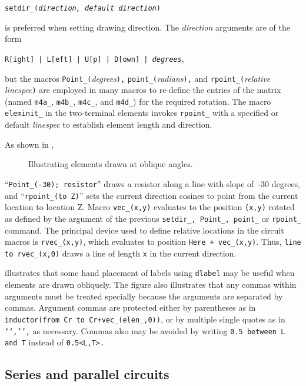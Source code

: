 {\tt setdir\_({\sl direction, default direction})}

\noindent
is preferred when setting drawing direction.  The {\sl direction} arguments
are of the form

{\tt R[ight] | L[eft] | U[p] | D[own] | {\sl degrees}},

\noindent
but the macros
{\tt Point\_(}{\sl degrees}{\tt ),}
{\tt point\_(}{\sl radians}{\tt ),}
and {\tt rpoint\_(}{\sl relative linespec}{\tt )} are employed in many macros
to re-define the entries
of the matrix
(named {\tt m4a\_}, {\tt m4b\_}, {\tt m4c\_}, and {\tt m4d\_})
for the required rotation.
The macro {\tt eleminit\_} in the two-terminal elements invokes
{\tt rpoint\_} with a specified or default {\sl linespec}
to establish element length and direction.

As shown in ,
\begin{figure}[ht]
\vspace{-\baselineskip}
   \parbox{4.5in}{\small }%
   \hfill\raise-0.7in\llap{\hbox{ }}%
   \vspace{-\baselineskip}
   \caption{Illustrating elements drawn at oblique angles.}
   \label{Oblique}
   \end{figure}
``{\tt Point\_(-30); resistor}'' draws a resistor
along a line with slope of~-30 degrees, and ``{\tt rpoint\_(to Z)}'' sets
the current direction cosines to point from the current location to location Z.
Macro {\tt vec\_(x,y)}
evaluates to the position {\tt (x,y)} rotated as defined by the
argument of the previous
{\tt setdir\_, Point\_, point\_} or {\tt rpoint\_} command.
The principal device used to define relative locations in the circuit macros
is {\tt rvec\_(x,y)}, which evaluates to position {\tt Here + vec\_(x,y)}.
Thus, {\tt line to rvec\_(x,0)} draws a line of length {\tt x} in the current
direction.

 illustrates that some hand placement of labels
using {\tt dlabel} may be useful when elements are drawn obliquely.
The figure also illustrates that any commas within \Mfour arguments must
be treated specially because the arguments are separated by commas.
Argument commas are protected either by parentheses as in
{\tt inductor(from Cr to Cr+vec\_(elen\_,0))}, or by multiple single quotes
as in {\tt `{`,'}',} as necessary.
Commas also may be avoided by writing
{\tt 0.5 between L and T} instead of {\tt 0.5<L,T>.}

\subsection{Series and parallel circuits\label{Seriesandparallel:}}

